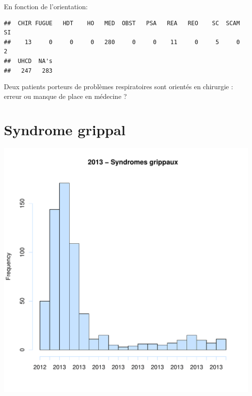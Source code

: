 \documentclass[12pt,english,french,twoside]{book}\usepackage[]{graphicx}\usepackage[]{color}
\makeatletter
\def\maxwidth{ %
  \ifdim\Gin@nat@width>\linewidth
    \linewidth
  \else
    \Gin@nat@width
  \fi
}
\newenvironment{kframe}{%
 \def\at@end@of@kframe{}%
 \ifinner\ifhmode%
  \def\at@end@of@kframe{\end{minipage}}%
  \begin{minipage}{\columnwidth}%
 \fi\fi%
 \def\FrameCommand##1{\hskip\@totalleftmargin \hskip-\fboxsep
 \colorbox{shadecolor}{##1}\hskip-\fboxsep
     \hskip-\linewidth \hskip-\@totalleftmargin \hskip\columnwidth}%
 \MakeFramed {\advance\hsize-\width
   \@totalleftmargin\z@ \linewidth\hsize
   \@setminipage}}%
 {\par\unskip\endMakeFramed%
 \at@end@of@kframe}
\newenvironment{knitrout}{}{} %
\makeatother
\begin{document}
En fonction de l'orientation:
\begin{knitrout}
\color{fgcolor}\begin{kframe}
\begin{verbatim}
##  CHIR FUGUE   HDT    HO   MED  OBST   PSA   REA   REO    SC  SCAM    SI 
##    13     0     0     0   280     0     0    11     0     5     0     2 
##  UHCD  NA's 
##   247   283
\end{verbatim}
\end{kframe}
\end{knitrout}


Deux patients porteurs de problèmes respiratoires sont orientés en chirurgie : erreur ou manque de place en médecine ?

\section{Syndrome grippal}

\begin{knitrout}
\color{fgcolor}
\includegraphics[width=\maxwidth]{figure/grippe} 

\end{knitrout}
\end{document}

